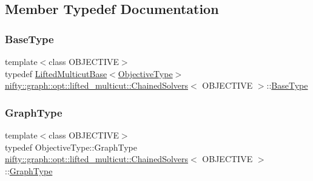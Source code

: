 \subsection{Member Typedef Documentation}
\mbox{\label{classnifty_1_1graph_1_1opt_1_1lifted__multicut_1_1ChainedSolvers_a8d7bda129d1f1afb9dca81ff513dca09}} 
\subsubsection{\texorpdfstring{Base\+Type}{BaseType}}
{\footnotesize\ttfamily template$<$class O\+B\+J\+E\+C\+T\+I\+VE$>$ \\
typedef \hyperlink{classnifty_1_1graph_1_1opt_1_1lifted__multicut_1_1LiftedMulticutBase}{Lifted\+Multicut\+Base}$<$\hyperlink{classnifty_1_1graph_1_1opt_1_1lifted__multicut_1_1ChainedSolvers_a59b16a41f7cc3aa24888584899f118e8}{Objective\+Type}$>$ \hyperlink{classnifty_1_1graph_1_1opt_1_1lifted__multicut_1_1ChainedSolvers}{nifty\+::graph\+::opt\+::lifted\+\_\+multicut\+::\+Chained\+Solvers}$<$ O\+B\+J\+E\+C\+T\+I\+VE $>$\+::\hyperlink{classnifty_1_1graph_1_1opt_1_1lifted__multicut_1_1ChainedSolvers_a8d7bda129d1f1afb9dca81ff513dca09}{Base\+Type}}

\mbox{\label{classnifty_1_1graph_1_1opt_1_1lifted__multicut_1_1ChainedSolvers_a64de588b4974fbbf88c56a0e172fcc94}} 
\subsubsection{\texorpdfstring{Graph\+Type}{GraphType}}
{\footnotesize\ttfamily template$<$class O\+B\+J\+E\+C\+T\+I\+VE$>$ \\
typedef Objective\+Type\+::\+Graph\+Type \hyperlink{classnifty_1_1graph_1_1opt_1_1lifted__multicut_1_1ChainedSolvers}{nifty\+::graph\+::opt\+::lifted\+\_\+multicut\+::\+Chained\+Solvers}$<$ O\+B\+J\+E\+C\+T\+I\+VE $>$\+::\hyperlink{classnifty_1_1graph_1_1opt_1_1lifted__multicut_1_1ChainedSolvers_a64de588b4974fbbf88c56a0e172fcc94}{Graph\+Type}}

